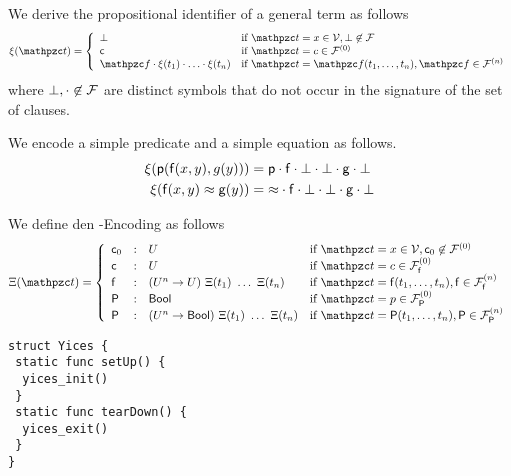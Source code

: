 \begin{definition}
	We derive the propositional identifier of a general term as follows
\begin{gather*}
	\MDEFINE{\xi(\mct)}{ll}{
	\bot &\text{if } \mct=x\in\mcV, \bot\not\in\mcF
	\tag*{}\\
	\mc &\text{if } \mct=c\in\mcFn[0]\\
	\mcf\encsep\xi(t_1)\encsep\ldots\encsep\xi(t_n) &\text{if }\mct=\mcf(t_1,\ldots,t_n), \mcf\in\mcFn
}
\end{gather*}
where \( \bot, \cdot\not\in\mathcal{F} \) are distinct symbols that do not occur in the signature of the set of clauses.
\end{definition}

\begin{example}
	We encode a simple predicate and a simple equation as follows.
	\begin{align*}
	\xi(\mathsf{p}(\mathsf{f}(x,y),g(y))) &= \mathsf{p}\cdot\mathsf{f}\cdot\bot\cdot\bot\cdot\mathsf{g}\cdot\bot
	\\
	\xi(\mathsf{f}(x,y)\approx \mathsf{g}(y)) &= {\approx}\cdot\mathsf{f}\cdot\bot\cdot\bot\cdot\mathsf{g}\cdot\bot
	\\
	\end{align*}
\end{example}

\begin{definition}
	We define den \SMT-Encoding as follows
\begin{gather*}
\MDEFINE{\Xi(\mct)}{lcll}{
	\mc_0&:&U &\text{if } \mct=x\in\mcV, \mc_0\not\in\mcFn[0]
	\\
	\mc&:&U &\text{if } \mct=c\in\mcFfn[0]
	\\
	\mf&:&(U^n\rightarrow U){\ }\Xi(t_1){\ }\ldots{\ }\Xi(t_n)
	&\text{if }\mct=\mf(t_1,\ldots,t_n), \mf\in\mcFfn{}
	\\
	\mP&:&\mathsf{Bool} &\text{if } \mct=p\in\mcFPn[0]
	\\
	\mP&:& (U^n \rightarrow\mathsf{Bool}){\ }\Xi(t_1){\ }\ldots{\ }\Xi(t_n)
	&\text{if }\mct=\mP(t_1,\ldots,t_n), \mP\in\mcFPn{}
}
\end{gather*}
\end{definition}

\begin{lstlisting}[language=FLEA]
struct Yices {
 static func setUp() {
  yices_init()
 }
 static func tearDown() {
  yices_exit()
 }
}
\end{lstlisting}

